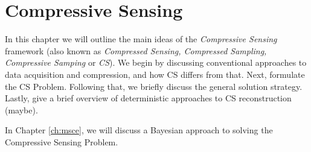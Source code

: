 \chapter{Compressive Sensing}
\label{ch:cs}




In this chapter we will outline the main ideas of the \emph{Compressive Sensing} framework (also known as \emph{Compressed Sensing, Compressed Sampling, Compressive Samping} or \emph{CS}).
We begin by discussing conventional approaches to data acquisition and compression, and how CS differs from that.
Next, formulate the CS Problem.
Following that, we briefly discuss the general solution strategy.
Lastly, give a brief overview of deterministic approaches to CS reconstruction (maybe).

In Chapter \ref{ch:msce}, we will discuss a Bayesian approach to solving the Compressive Sensing Problem.


